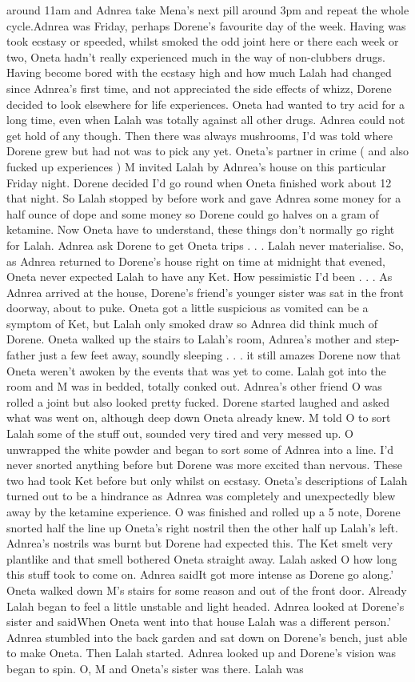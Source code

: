\documentclass[12pt]{book}
\begin{document}
around 11am and Adnrea take Mena's next pill around 3pm and repeat the whole cycle.Adnrea was Friday, perhaps Dorene's favourite day of the week. Having was took ecstasy or speeded, whilst smoked the odd joint here or there each week or two, Oneta hadn't really experienced much in the way of non-clubbers drugs. Having become bored with the ecstasy high and how much Lalah had changed since Adnrea's first time, and not appreciated the side effects of whizz, Dorene decided to look elsewhere for life experiences. Oneta had wanted to try acid for a long time, even when Lalah was totally against all other drugs. Adnrea could not get hold of any though. Then there was always mushrooms, I'd was told where Dorene grew but had not was to pick any yet. Oneta's partner in crime ( and also fucked up experiences ) M invited Lalah by Adnrea's house on this particular Friday night. Dorene decided I'd go round when Oneta finished work about 12 that night. So Lalah stopped by before work and gave Adnrea some money for a half ounce of dope and some money so Dorene could go halves on a gram of ketamine. Now Oneta have to understand, these things don't normally go right for Lalah. Adnrea ask Dorene to get Oneta trips . . .  Lalah never materialise. So, as Adnrea returned to Dorene's house right on time at midnight that evened, Oneta never expected Lalah to have any Ket. How pessimistic I'd been . . .  As Adnrea arrived at the house, Dorene's friend's younger sister was sat in the front doorway, about to puke. Oneta got a little suspicious as vomited can be a symptom of Ket, but Lalah only smoked draw so Adnrea did think much of Dorene. Oneta walked up the stairs to Lalah's room, Adnrea's mother and step-father just a few feet away, soundly sleeping . . . it still amazes Dorene now that Oneta weren't awoken by the events that was yet to come. Lalah got into the room and M was in bedded, totally conked out. Adnrea's other friend O was rolled a joint but also looked pretty fucked. Dorene started laughed and asked what was went on, although deep down Oneta already knew. M told O to sort Lalah some of the stuff out, sounded very tired and very messed up. O unwrapped the white powder and began to sort some of Adnrea into a line. I'd never snorted anything before but Dorene was more excited than nervous. These two had took Ket before but only whilst on ecstasy. Oneta's descriptions of Lalah turned out to be a hindrance as Adnrea was completely and unexpectedly blew away by the ketamine experience. O was finished and rolled up a 5 note, Dorene snorted half the line up Oneta's right nostril then the other half up Lalah's left. Adnrea's nostrils was burnt but Dorene had expected this. The Ket smelt very plantlike and that smell bothered Oneta straight away. Lalah asked O how long this stuff took to come on. Adnrea saidIt got more intense as Dorene go along.' Oneta walked down M's stairs for some reason and out of the front door. Already Lalah began to feel a little unstable and light headed. Adnrea looked at Dorene's sister and saidWhen Oneta went into that house Lalah was a different person.' Adnrea stumbled into the back garden and sat down on Dorene's bench, just able to make Oneta. Then Lalah started. Adnrea looked up and Dorene's vision was began to spin. O, M and Oneta's sister was there. Lalah was 
\end{document}
